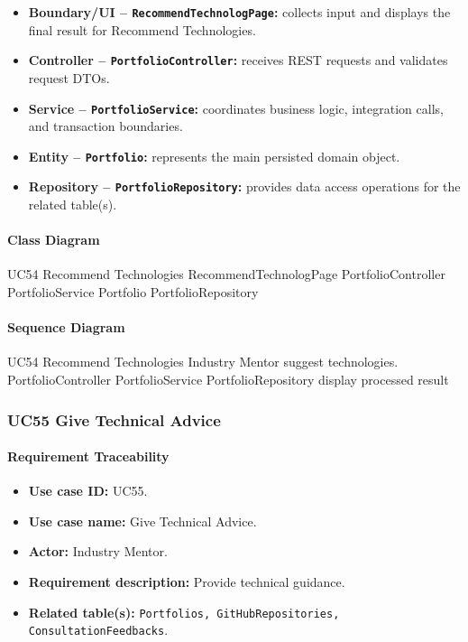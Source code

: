 \begin{itemize}
    \item \textbf{Boundary/UI -- \texttt{RecommendTechnologPage}:} collects input and displays the final result for Recommend Technologies.
    \item \textbf{Controller -- \texttt{PortfolioController}:} receives REST requests and validates request DTOs.
    \item \textbf{Service -- \texttt{PortfolioService}:} coordinates business logic, integration calls, and transaction boundaries.
    \item \textbf{Entity -- \texttt{Portfolio}:} represents the main persisted domain object.
    \item \textbf{Repository -- \texttt{PortfolioRepository}:} provides data access operations for the related table(s).
\end{itemize}

\paragraph{Class Diagram}

\ClassDiagram
{UC54 Recommend Technologies}
{RecommendTechnologPage}
{PortfolioController}
{PortfolioService}
{Portfolio}
{PortfolioRepository}

\paragraph{Sequence Diagram}

\SequenceDiagram
{UC54 Recommend Technologies}
{Industry Mentor}
{suggest technologies.}
{PortfolioController}
{PortfolioService}
{PortfolioRepository}
{display processed result}

\subsubsection{UC55 Give Technical Advice}

\paragraph{Requirement Traceability}

\begin{itemize}
    \item \textbf{Use case ID:} UC55.
    \item \textbf{Use case name:} Give Technical Advice.
    \item \textbf{Actor:} Industry Mentor.
    \item \textbf{Requirement description:} Provide technical guidance.
    \item \textbf{Related table(s):} \texttt{Portfolios, GitHubRepositories, ConsultationFeedbacks}.
\end{itemize}

